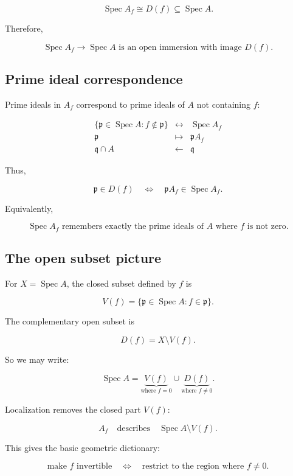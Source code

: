 \documentclass[12pt,a4paper]{article}
\newcommand{\Spec}{\operatorname{Spec}}
\theoremstyle{notespace}
\begin{document}
\[
\boxed{
	\Spec A_f \cong D(f)\subseteq \Spec A.
}
\]

Therefore,

\[
\boxed{
	\Spec A_f\to \Spec A
	\text{ is an open immersion with image }D(f).
}
\]

\subsection{Prime ideal correspondence}

Prime ideals in \(A_f\) correspond to prime ideals of \(A\) not containing \(f\):

\[
\begin{array}{ccc}
	\{\mathfrak p\in\Spec A:f\notin\mathfrak p\}
	&
	\longleftrightarrow
	&
	\Spec A_f
	\\[2mm]
	\mathfrak p
	&
	\longmapsto
	&
	\mathfrak pA_f
	\\[2mm]
	\mathfrak q\cap A
	&
	\longleftarrow
	&
	\mathfrak q
\end{array}
\]

Thus,

\[
\boxed{
	\mathfrak p\in D(f)
	\quad\Longleftrightarrow\quad
	\mathfrak pA_f\in\Spec A_f.
}
\]

Equivalently,

\[
\boxed{
	\Spec A_f
	\text{ remembers exactly the prime ideals of }A
	\text{ where }f\text{ is not zero.}
}
\]

\subsection{The open subset picture}

For \(X=\Spec A\), the closed subset defined by \(f\) is

\[
V(f)=\{\mathfrak p\in\Spec A:f\in\mathfrak p\}.
\]

The complementary open subset is

\[
D(f)=X\setminus V(f).
\]

So we may write:

\[
\Spec A
=
\underbrace{V(f)}_{\text{where }f=0}
\cup
\underbrace{D(f)}_{\text{where }f\neq 0}.
\]

Localization removes the closed part \(V(f)\):

\[
\boxed{
	A_f
	\quad\text{describes}\quad
	\Spec A\setminus V(f).
}
\]

This gives the basic geometric dictionary:

\[
\boxed{
	\text{make }f\text{ invertible}
}
\quad\Longleftrightarrow\quad
\boxed{
	\text{restrict to the region where }f\neq 0.
}
\]
\end{document}

